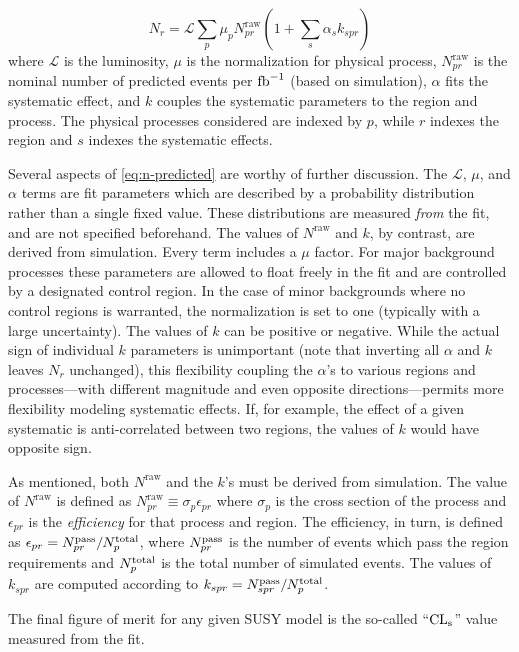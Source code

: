 \begin{equation}
  N_r = \mathcal{L} \sum_{p} \mu_p N_{pr}^{\text{raw}} \left(1 + \sum_{s} \alpha_s k_{spr}\right)
\label{eq:n-predicted}
\end{equation}
where $\mathcal{L}$ is the luminosity, $\mu$ is the normalization for physical process, $N_{pr}^{\text{raw}}$ is the nominal number of predicted events per $\text{fb}^{-1}$ (based on simulation), $\alpha$ fits the systematic effect, and $k$ couples the systematic parameters to the region and process. The physical processes considered are indexed by $p$, while $r$ indexes the region and $s$ indexes the systematic effects.

Several aspects of \cref{eq:n-predicted} are worthy of further discussion. The $\mathcal{L}$, $\mu$, and $\alpha$ terms are fit parameters which are described by a probability distribution rather than a single fixed value. These distributions are measured \emph{from} the fit, and are not specified beforehand.
The values of $N^{\text{raw}}$ and $k$, by contrast, are derived from simulation.
Every term includes a $\mu$ factor. For major background processes these parameters are allowed to float freely in the fit and are controlled by a designated control region. In the case of minor backgrounds where no control regions is warranted, the normalization is set to one (typically with a large uncertainty).
The values of $k$ can be positive or negative. While the actual sign of individual $k$ parameters is unimportant (note that inverting all $\alpha$ and $k$ leaves $N_r$ unchanged), this flexibility coupling the $\alpha$'s to various regions and processes---with different magnitude and even opposite directions---permits more flexibility modeling systematic effects. If, for example, the effect of a given systematic is anti-correlated between two regions, the values of $k$ would have opposite sign.

As mentioned, both $N^{\text{raw}}$ and the $k$'s must be derived from simulation. The value of $N^{\text{raw}}$ is defined as
$N_{pr}^{\text{raw}} \equiv \sigma_{p} \epsilon_{pr}$ where $\sigma_{p}$ is the cross section of the process and $\epsilon_{pr}$ is the \emph{efficiency} for that process and region.
The efficiency, in turn, is defined as $\epsilon_{pr} = N_{pr}^{\rm pass} / N^{\rm total}_{p}$, where $N^{\rm pass}_{pr}$ is the number of events which pass the region requirements and $N^{\rm total}_p$ is the total number of simulated events. The values of $k_{spr}$ are computed according to $k_{spr} = N^{\text{pass}}_{spr} / N^{\rm total}_{p}$.

The final figure of merit for any given SUSY model is the so-called ``$\mathrm{CL}_{\mathrm{s}}$'' value measured from the fit.
